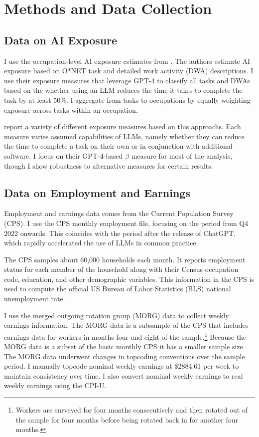 \documentclass[12pt]{article}
\numberwithin{equation}{section}
\theoremstyle{theorem}\newcustomtheorem{theorem}{{\bf\sc Theorem}}
\theoremstyle{definition}\newcustomtheorem{assumption}{{\bf\sc Assumption}}
\theoremstyle{theorem} \newcustomtheorem{proposition}{{\bf\sc Proposition}}
\begin{document}
\section{Methods and Data Collection} 

\subsection{Data on AI Exposure}

I use the occupation-level AI exposure estimates from \citet{eloundou_gpts_2024}. The authors estimate AI exposure based on O*NET task and detailed work activity (DWA) descriptions. I use their exposure measures that leverage GPT-4 to classify all tasks and DWAs based on the whether using an LLM reduces the time it takes to complete the task by at least 50\%. I aggregate from tasks to occupations by equally weighting exposure across tasks within an occupation. 

\citet{eloundou_gpts_2024} report a variety of different exposure measures based on this approachs. Each measure varies assumed capabilities of LLMs, namely whether they can reduce the time to complete a task on their own or in conjunction with additional software. I focus on their GPT-4-based $\beta$ measure for most of the analysis, though I show robustness to alternative measures for certain results.  

\subsection{Data on Employment and Earnings}

Employment and earnings data comes from the Current Population Survey (CPS). I use the CPS monthly employment file, focusing on the period from Q4 2022 onwards. This coincides with the period after the release of ChatGPT, which rapidly accelerated the use of LLMs in common practice. 

The CPS samples about 60,000 households each month. It reports employment status for each member of the household along with their Census occupation code, education, and other demographic variables. This information in the CPS is used to compute the official US Bureau of Labor Statistics (BLS) national unemployment rate. 

I use the merged outgoing rotation group (MORG) data to collect weekly earnings information. The MORG data is a subsample of the CPS that includes earnings data for workers in months four and eight of the sample.\footnote{Workers are surveyed for four months consecutively and then rotated out of the sample for four months before being rotated back in for another four months. } Because the MORG data is a subset of the basic monthly CPS it has a smaller sample size. The MORG data underwent changes in topcoding conventions over the sample period. I manually topcode nominal weekly earnings at \$2884.61 per week to maintain consistency over time. I also convert nominal weekly earnings to real weekly earnings using the CPI-U.
\end{document}
